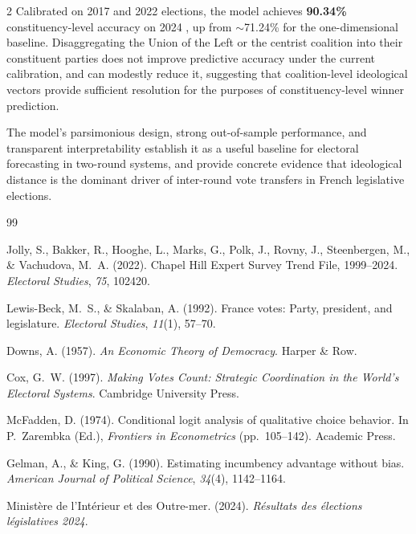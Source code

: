 \documentclass[10pt, a4paper]{article}
\begin{document}
\begin{multicols}{2}
Calibrated on 2017 and 2022 elections, the model achieves \textbf{90.34\%}
constituency-level accuracy on 2024 , up from $\sim$71.24\% for the
one-dimensional baseline.
Disaggregating the Union of the Left or the centrist coalition into their
constituent parties does not improve predictive accuracy under the current
calibration, and can modestly reduce it, suggesting that coalition-level
ideological vectors provide sufficient resolution for the purposes of
constituency-level winner prediction.

The model's parsimonious design, strong out-of-sample performance, and
transparent interpretability establish it as a useful baseline for electoral
forecasting in two-round systems, and provide concrete evidence that
ideological distance is the dominant driver of inter-round vote transfers
in French legislative elections.

\balance    %

\end{multicols}

\newpage

\begin{thebibliography}{99}

Jolly, S., Bakker, R., Hooghe, L., Marks, G., Polk, J., Rovny, J.,
Steenbergen, M., \& Vachudova, M.~A. (2022).
\newblock Chapel Hill Expert Survey Trend File, 1999--2024.
\newblock \textit{Electoral Studies}, \textit{75}, 102420.

Lewis-Beck, M.~S., \& Skalaban, A. (1992).
\newblock France votes: Party, president, and legislature.
\newblock \textit{Electoral Studies}, \textit{11}(1), 57--70.

Downs, A. (1957).
\newblock \textit{An Economic Theory of Democracy}.
\newblock Harper \& Row.

Cox, G.~W. (1997).
\newblock \textit{Making Votes Count: Strategic Coordination in the World's
  Electoral Systems}.
\newblock Cambridge University Press.

McFadden, D. (1974).
\newblock Conditional logit analysis of qualitative choice behavior.
\newblock In P.~Zarembka (Ed.), \textit{Frontiers in Econometrics}
  (pp.\ 105--142). Academic Press.

Gelman, A., \& King, G. (1990).
\newblock Estimating incumbency advantage without bias.
\newblock \textit{American Journal of Political Science}, \textit{34}(4),
  1142--1164.

Ministère de l'Intérieur et des Outre-mer. (2024).
\newblock \textit{Résultats des élections législatives 2024}.

\end{thebibliography}
\end{document}
